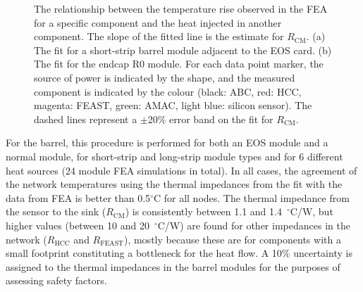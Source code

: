 \begin{figure}[ht]
\centering
{}\quad\quad
{}
\caption{The relationship between the temperature rise observed in the FEA for a specific component and the heat injected in another component. The slope of the fitted line is the estimate for $R_\text{CM}$.
(a) The fit for a short-strip barrel module adjacent to the EOS card. (b) The fit for the endcap R0 module.
For each data point marker, the source of power is indicated by the shape, and the measured component is indicated
by the colour (black: ABC, red: HCC, magenta: FEAST, green: AMAC, light blue: silicon sensor).
The dashed lines represent a $\pm$20\% error band on the fit for $R_\text{CM}$.
}
\label{fig:solving_for_Rcm}
\end{figure}


For the barrel, this procedure is performed for both an EOS module and a normal module, for short-strip and long-strip module types and for 6 different heat sources (24 module FEA simulations in total). In all cases, the agreement of the network temperatures using the thermal impedances from the fit with the data from FEA is better than 0.5$^\circ$C for all nodes. The thermal impedance from the sensor to the sink ($R_\text{CM}$) is consistently between 1.1 and 1.4~$^\circ$C/W, but higher values (between 10 and 20~$^\circ$C/W) are found for other impedances in the network ($R_\text{HCC}$ and $R_\text{FEAST}$), mostly because these are for components with a small footprint constituting a bottleneck for the heat flow.
A 10\% uncertainty is assigned to the thermal impedances in the barrel modules for the purposes of assessing safety factors.


